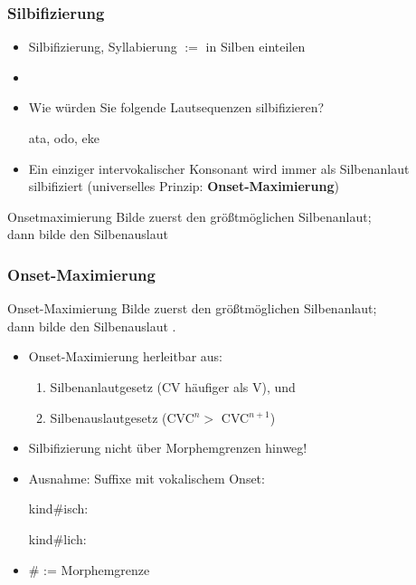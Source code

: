 \begin{frame}
\frametitle{Silbifizierung}

\begin{itemize}
	\item Silbifizierung, Syllabierung $:=$ in Silben einteilen
	\item[]
	\item Wie würden Sie folgende Lautsequenzen silbifizieren?

	  \ea
          ata, odo, eke
          \z

\pause

	\item Ein einziger intervokalischer Konsonant wird immer als Silbenanlaut silbifiziert (universelles Prinzip: \textbf{Onset-Maximierung})
	
	
\end{itemize}

\begin{block}{Onsetmaximierung}
Bilde zuerst den größtmöglichen Silbenanlaut;\\ dann bilde den Silbenauslaut \citep[218]{Hall00a}
\end{block}

\end{frame}




\begin{frame}
\frametitle{Onset-Maximierung}

\begin{block}{Onset-Maximierung}
Bilde zuerst den größtmöglichen Silbenanlaut;\\
dann bilde den Silbenauslaut \citep[218]{Hall00a}.
\end{block}


\begin{itemize}
	\item Onset-Maximierung herleitbar aus:
	\begin{enumerate}
		\item Silbenanlautgesetz (CV häufiger als V), und
		\item Silbenauslautgesetz (CVC$^{n} >$ CVC$^{n+1}$)
	\end{enumerate}

\pause
	\item Silbifizierung nicht über Morphemgrenzen hinweg! 
	\item Ausnahme: Suffixe mit vokalischem Onset:
	
	  \ea
          kind\#isch: 
          \z
	
	  \ea
          kind\#lich: \textipa{[kInt.lI\c{c}]}
          \z
          
     \item \# := Morphemgrenze


	
\end{itemize}

\end{frame}


